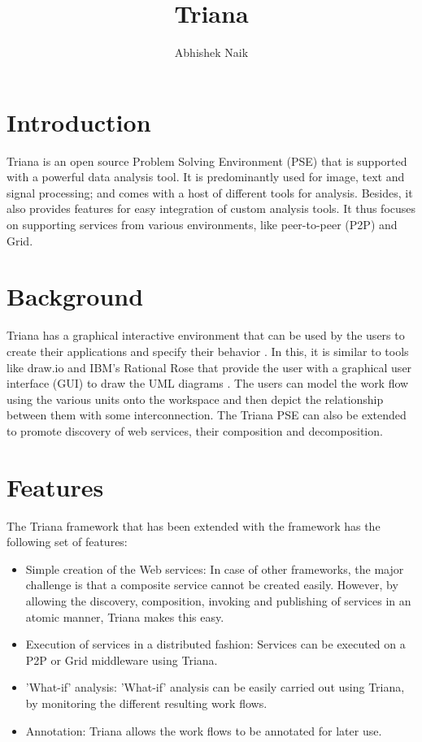 \documentclass[9pt,twocolumn,twoside]{styles/osajnl}
\title{Triana}
\author{Abhishek Naik}
\affil[1]{School of Informatics and Computing, Bloomington, IN 47408, U.S.A.}
\affil[*]{Corresponding authors: ahnaik@indiana.edu}
\begin{document}
\maketitle

\section{Introduction}

Triana is an open source Problem Solving Environment (PSE) that is
supported with a powerful data analysis tool.  It is predominantly
used for image, text and signal processing; and comes with a host of
different tools for analysis.  Besides, it also provides features for
easy integration of custom analysis tools.  It thus focuses on
supporting services from various environments, like peer-to-peer (P2P)
and Grid.

\section{Background}
Triana has a graphical interactive environment that can be used by 
the users to create their applications and specify their behavior \cite{TrianaDocumentation1}.  
In this, it is similar to tools like draw.io and IBM's Rational Rose that 
provide the user with a graphical user interface (GUI) to draw
the UML diagrams \cite{DrawIO} \cite{IBM-Rational-Rose}.  The users can 
model the work flow using the various units onto the workspace and then 
depict the relationship between them with some interconnection.  
The Triana PSE can also be extended to promote discovery of web services,
their composition and decomposition.

\section{Features}
The Triana framework that has been extended with the framework has the 
following set of features: 

\begin{itemize} 

\item Simple creation of the Web services: In case of other frameworks, 
the major challenge is that a composite service cannot be created 
easily. However, by allowing the discovery, composition, invoking and 
publishing of services in an atomic manner, Triana makes this easy. 

\item Execution of services in a distributed fashion: Services can be 
executed on a P2P or Grid middleware using Triana. 

\item 'What-if' analysis: 'What-if' analysis can be easily carried out 
using Triana, by monitoring the different resulting work flows. 

\item Annotation: Triana allows the work flows to be annotated for later 
use. 

\end{itemize}
\end{document}
